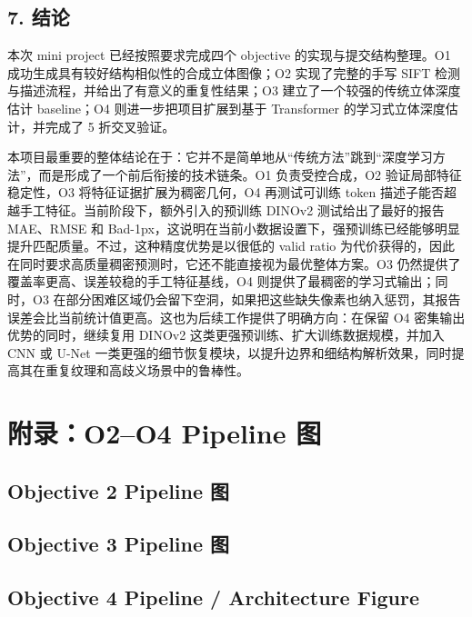 \documentclass[
  11pt,
]{article}
\begin{document}
\subsection{7. 结论}\label{ux7ed3ux8bba}

本次 mini project 已经按照要求完成四个 objective
的实现与提交结构整理。O1 成功生成具有较好结构相似性的合成立体图像；O2
实现了完整的手写 SIFT 检测与描述流程，并给出了有意义的重复性结果；O3
建立了一个较强的传统立体深度估计 baseline；O4 则进一步把项目扩展到基于
Transformer 的学习式立体深度估计，并完成了 5 折交叉验证。

本项目最重要的整体结论在于：它并不是简单地从``传统方法''跳到``深度学习方法''，而是形成了一个前后衔接的技术链条。O1
负责受控合成，O2 验证局部特征稳定性，O3 将特征证据扩展为稠密几何，O4
再测试可训练 token 描述子能否超越手工特征。当前阶段下，额外引入的预训练 DINOv2 测试给出了最好的报告 MAE、RMSE 和 Bad-1px，这说明在当前小数据设置下，强预训练已经能够明显提升匹配质量。不过，这种精度优势是以很低的 valid ratio 为代价获得的，因此在同时要求高质量稠密预测时，它还不能直接视为最优整体方案。O3 仍然提供了覆盖率更高、误差较稳的手工特征基线，O4 则提供了最稠密的学习式输出；同时，O3 在部分困难区域仍会留下空洞，如果把这些缺失像素也纳入惩罚，其报告误差会比当前统计值更高。这也为后续工作提供了明确方向：在保留 O4
密集输出优势的同时，继续复用 DINOv2 这类更强预训练、扩大训练数据规模，并加入 CNN 或 U-Net 一类更强的细节恢复模块，以提升边界和细结构解析效果，同时提高其在重复纹理和高歧义场景中的鲁棒性。

\clearpage
\appendix
\section{附录：O2--O4 Pipeline 图}

\subsection*{Objective 2 Pipeline 图}

\clearpage
\subsection*{Objective 3 Pipeline 图}

\clearpage
\subsection*{Objective 4 Pipeline / Architecture Figure}
\end{document}
